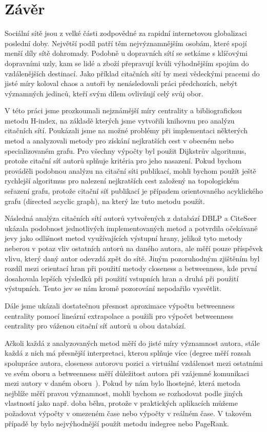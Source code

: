 \documentclass{bakalarka}
\begin{document}
\chapter{Závěr}
Sociální sítě jsou z velké části zodpovědné za rapidní internetovou globalizaci
poslední doby. Největší podíl patří těm nejvýznamnějším osobám, které spojí
menší díly sítě dohromady. Podobně u dopravních sítí se setkáme s klíčovými
dopravními uzly, kam se lidé a zboží přepravují kvůli výhodnějším spojům do
vzdálenějších destinací. Jako příklad citačních sítí by mezi vědeckými pracemi
do jisté míry koloval chaos a autoři by nenásledovali práci předchozích, nebýt
významných jedinců, kteří svým dílem ovlivňují celý svůj obor.

V této práci jsme prozkoumali nejznámější míry centrality a bibliografickou
metodu H-index, na základě kterých jsme vytvořili knihovnu pro analýzu
citačních sítí. Poukázali jsme na možné problémy při implementaci některých
metod a analyzovali metody pro získání nejkratších cest v obecném nebo
specializovaném grafu. Pro všechny výpočty byl použit Dijkstrův algoritmus,
protože citační síť autorů splňuje kritéria pro jeho nasazení. Pokud bychom
prováděli podobnou analýzu na citační síti publikací, mohli bychom použít ještě
rychlejší algoritmus pro nalezení nejkratších cest založený na topologickém
seřazení grafu, protože citační síť publikací je případem orientovaného
acyklického grafu (directed acyclic graph), na který lze tuto metodu použít. 

Následná analýza citačních sítí autorů vytvořených z databází DBLP a CiteSeer
ukázala podobnost jednotlivých implementovaných metod a potvrdila očekávané
jevy jako odlišnost metod využívajících výstupní hrany, jelikož tyto metody
neberou v potaz vliv ostatních autorů na daného autora, ale měří pouze
příspěvek vlivu, který daný autor odevzdá zpět do sítě.  Jiným pozoruhodným
zjištěním byl rozdíl mezi orientací hran při použití metody closeness a
betweenness, kde první dosahovala lepších výsledků při použití vstupních hran a
druhá při použití výstupních. Tento jev se nám kromě pozorování nepodařilo
vysvětlit.

Dále jsme ukázali dostatečnou přesnost aproximace výpočtu betweenness
centrality pomocí lineární extrapolace a použili pro výpočet betweenness
centrality pro váženou citační síť autorů u obou databází.

Ačkoli každá z analyzovaných metod měří do jisté míry významnost autora, stále
každá z nich má přesnější interpretaci, kterou splňuje více (degree měří rozsah
spolupráce autora, closeness autorovu pozici a virtuální vzdálenost mezi
ostatními ve svém oboru a betweenness měří důležitost autora při vzájemné
komunikaci mezi autory v daném oboru~\citep{yanding2009}). Pokud by nám bylo
lhostejné, která metoda nejblíže měří pravou významnost, mohli bychom se
rozhodovat podle jiných vlastností jako např. doba běhu, protože v praktických
aplikacích můžeme požadovat výpočty v omezeném čase nebo výpočty v reálném
čase. V takovém případě by bylo nejvýhodnější použít metodu indegree nebo
PageRank.
\end{document}
